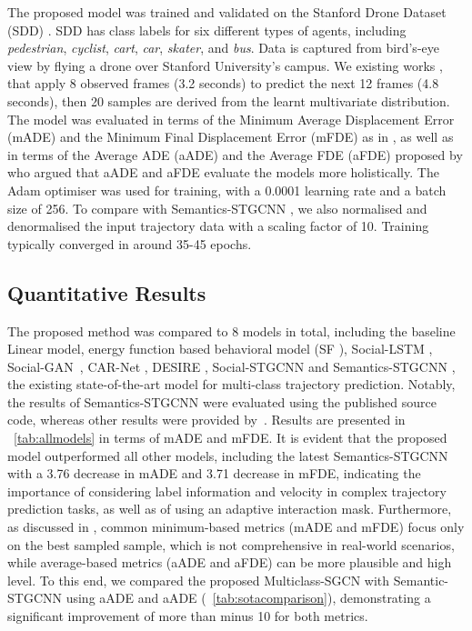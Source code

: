 \documentclass{article}
\begin{document}
The proposed model was trained and validated on the Stanford Drone Dataset (SDD) \cite{Robicquet2016SDD}.
SDD has class labels for six different types of agents, including \textit{pedestrian}, \textit{cyclist}, \textit{cart}, \textit{car}, \textit{skater}, and \textit{bus}. Data is captured from bird's-eye view by flying a drone over Stanford University's campus. We existing works \cite{shi2021sgcn}, \cite{gupta2018social} that apply 8 observed frames (3.2 seconds) to predict the next 12 frames (4.8 seconds), then 20 samples are derived from the learnt multivariate distribution. The model was evaluated in terms of the Minimum Average Displacement Error (mADE) and the Minimum Final Displacement Error (mFDE) as in \cite{Mohamed2020socialstgcnn}, as well as in terms of the Average ADE (aADE) and the Average FDE (aFDE) proposed by \cite{rainbow2021semanticsstgcnn} who argued that aADE and aFDE evaluate the models more holistically. The Adam \cite{kingma2014method} optimiser was used for training, with a 0.0001 learning rate and a batch size of 256. 
To compare with Semantics-STGCNN \cite{rainbow2021semanticsstgcnn}, we also normalised and denormalised the input trajectory data with a scaling factor of 10. Training typically converged in around 35-45 epochs.


\subsection{Quantitative Results}

The proposed method was compared to 8 models in total, including the baseline Linear model, energy function based behavioral model (SF \cite{Yamaguchi2011bm} ), Social-LSTM \cite{Alexandre2016lstm}, Social-GAN~\cite{gupta2018social}, CAR-Net \cite{sadeghian2017carnet}, DESIRE \cite{lee2017desire}, Social-STGCNN \cite{Mohamed2020socialstgcnn} and Semantics-STGCNN \cite{rainbow2021semanticsstgcnn}, the existing state-of-the-art model for multi-class trajectory prediction. Notably, the results of Semantics-STGCNN were evaluated using the published source code, whereas other results were provided by~\cite{rainbow2021semanticsstgcnn}. Results are presented in \tablename~\ref{tab:allmodels} in terms of mADE and mFDE. It is evident that the proposed model outperformed all other models, including the latest Semantics-STGCNN \cite{rainbow2021semanticsstgcnn} with a 3.76 decrease in mADE and 3.71 decrease in mFDE, indicating the importance of considering label information and velocity in complex trajectory prediction tasks, as well as of using an adaptive interaction mask. Furthermore, as discussed in \cite{rainbow2021semanticsstgcnn}, common minimum-based metrics (mADE and mFDE) focus only on the best sampled sample, which is not comprehensive in real-world scenarios, while average-based metrics (aADE and aFDE) can be more plausible and high level. To this end, we compared the proposed Multiclass-SGCN with Semantic-STGCNN using aADE and aADE (\tablename~\ref{tab:sotacomparison}), demonstrating a significant improvement of more than minus 10 for both metrics.
\end{document}
